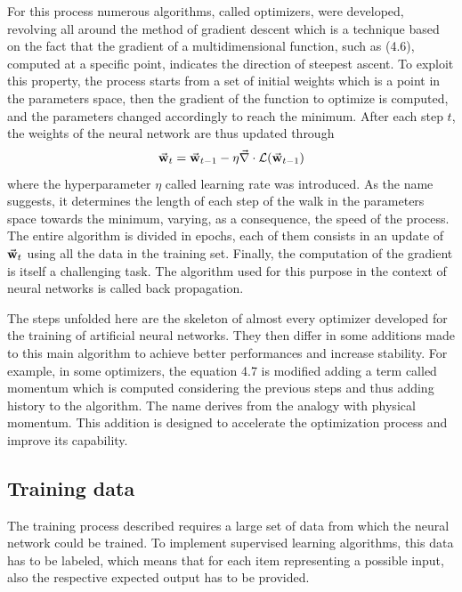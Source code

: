 \documentclass[a4paper,10pt]{report}
\begin{document}
For this process numerous algorithms, called optimizers, were developed, 
revolving all around the method of gradient descent
which is a technique based on the fact that the gradient of a multidimensional function, such as (4.6), computed
at a specific point, indicates the direction of steepest ascent.
To exploit this property, the process starts from a set of initial weights which is a point in the parameters space, 
then the gradient of the function to optimize is computed, and the parameters changed accordingly to reach the minimum.
After each step $t$, the weights of the neural network are thus updated through
\begin{equation}
    \va w_t = \va w_{t-1} - \eta \va \nabla \cdot \mathcal{L}(\va w_{t-1})
\end{equation}
where the hyperparameter $\eta$ called learning rate was introduced. As the name suggests, it determines 
the length of each step of the walk in the parameters space towards the minimum, varying, as a consequence,
the speed of the process. The entire algorithm is divided in epochs, each of them consists in an update of $\va w_t$
using all the data in the training set.
Finally, the computation of the gradient is itself a challenging task. The algorithm used for this purpose in the context 
of neural networks is called back propagation.

The steps unfolded here are the skeleton of almost every optimizer developed for the training of artificial neural 
networks. They then differ in some additions
made to this main algorithm to achieve better performances and increase stability.
For example, in some optimizers, the equation 4.7 is modified adding a term called momentum which is computed 
considering the previous steps and thus adding history to the algorithm. The name derives from the analogy with physical momentum.
This addition is designed to accelerate the optimization process and improve its capability.

\subsection{Training data}

The training process described requires a large set of data from which 
the neural network could be trained.
To implement supervised learning algorithms, this data has to be labeled, which means that
for each item representing a possible input, also the respective 
expected output has to be provided.
\end{document}
